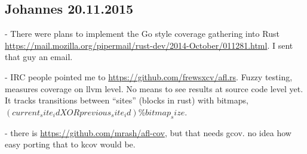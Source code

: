 \documentclass{scrartcl}
\begin{document}
\subsection*{Johannes 20.11.2015}
 - There were plans to implement the Go style coverage gathering into Rust \url{https://mail.mozilla.org/pipermail/rust-dev/2014-October/011281.html}. I sent that guy an email.

 - IRC people pointed me to \url{https://github.com/frewsxcv/afl.rs}. Fuzzy testing, measures coverage on llvm level. No means to see results at source code level yet. It tracks transitions between "`sites"' (blocks in rust) with bitmaps, $(current_site_id XOR previous_site_id) \% bitmap_size$.

 - there is \url{https://github.com/mrash/afl-cov}, but that needs gcov. no idea how easy porting that to kcov would be.
\end{document}
